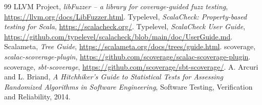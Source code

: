 \documentclass[11pt,a4paper]{report}
\begin{document}
\begin{thebibliography}{99}
 LLVM Project, \emph{libFuzzer -- a library for coverage-guided fuzz testing}, \url{https://llvm.org/docs/LibFuzzer.html}.
 Typelevel, \emph{ScalaCheck: Property-based testing for Scala}, \url{https://scalacheck.org/}.
 Typelevel, \emph{ScalaCheck User Guide}, \url{https://github.com/typelevel/scalacheck/blob/main/doc/UserGuide.md}.
 Scalameta, \emph{Tree Guide}, \url{https://scalameta.org/docs/trees/guide.html}.
 scoverage, \emph{scalac-scoverage-plugin}, \url{https://github.com/scoverage/scalac-scoverage-plugin}.
 scoverage, \emph{sbt-scoverage}, \url{https://github.com/scoverage/sbt-scoverage/}.
 A. Arcuri and L. Briand, \emph{A Hitchhiker's Guide to Statistical Tests for Assessing Randomized Algorithms in Software Engineering}, Software Testing, Verification and Reliability, 2014.

\end{thebibliography}
\end{document}
